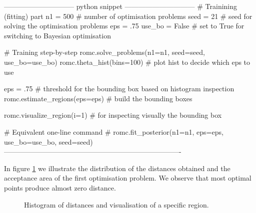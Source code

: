 \begin{Code}
------------------------------ python snippet ------------------------------
  # Trainining (fitting) part
  n1 = 500 # number of optimisation problems
  seed = 21 # seed for solving the optimisation problems
  eps = .75 
  use_bo = False # set to True for switching to Bayesian optimisation

  # Training step-by-step
  romc.solve_problems(n1=n1, seed=seed, use_bo=use_bo)
  romc.theta_hist(bins=100) # plot hist to decide which eps to use

  eps = .75 # threshold for the bounding box based on histogram inspection
  romc.estimate_regions(eps=eps) # build the bounding boxes

  romc.visualize_region(i=1) # for inspecting visually the bounding box

  # Equivalent one-line command
  # romc.fit_posterior(n1=n1, eps=eps, use_bo=use_bo, seed=seed)
----------------------------------------------------------------------------  
\end{Code}

In figure \ref{fig:example_training_hist} we illustrate the
distribution of the distances obtained and the acceptance area of the
first optimisation problem. We observe that most optimal points
produce almost zero distance.




  
\begin{figure}[h]
  \begin{center}    
    
    
  \end{center}
  \caption[Histogram of distances at the 1D example.]{Histogram of
    distances and visualisation of a specific region.}
  \label{fig:example_training_hist}
\end{figure}

